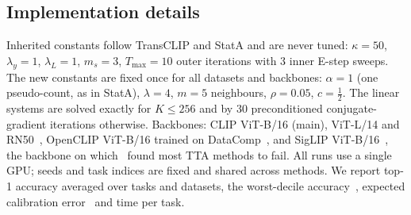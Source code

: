 \subsection{Implementation details}
Inherited constants follow TransCLIP and StatA and are never tuned: $\kappa{=}50$, $\lambda_y{=}1$, $\lambda_L{=}1$, $m_s{=}3$, $T_{\max}{=}10$ outer iterations with 3 inner E-step sweeps. The new constants are fixed once for all datasets and backbones: $\alpha{=}1$ (one pseudo-count, as in StatA), $\lambda{=}4$, $m{=}5$ neighbours, $\rho{=}0.05$, $c{=}\tfrac12$. The linear systems are solved exactly for $K\le256$ and by 30 preconditioned conjugate-gradient iterations otherwise. Backbones: CLIP ViT-B/16 (main), ViT-L/14 and RN50~\cite{radford2021clip}, OpenCLIP ViT-B/16 trained on DataComp~\cite{cherti2023openclip}, and SigLIP ViT-B/16~\cite{zhai2023siglip}, the backbone on which~\cite{sheng2025illusion} found most TTA methods to fail. All runs use a single GPU; seeds and task indices are fixed and shared across methods. We report top-1 accuracy averaged over tasks and datasets, the worst-decile accuracy~\cite{fuchs2025oga}, expected calibration error~\cite{guo2017calibration} and time per task.
